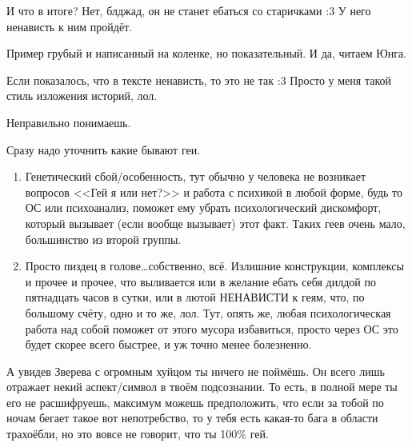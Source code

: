 \documentclass[a4paper,14pt,oneside]{memoir}
\begin{document}
И что в итоге? Нет, блджад, он не станет ебаться со старичками :3 У него ненависть к ним пройдёт. 

Пример грубый и написанный на коленке, но показательный. И да, читаем Юнга. 

Если показалось, что в тексте ненависть, то это не так :3 Просто у меня такой стиль изложения историй, лол.

\medskip


\medskip

Неправильно понимаешь.

Сразу надо уточнить какие бывают геи.

\begin{enumerate}
\item Генетический сбой/особенность, тут обычно у человека не возникает вопросов <<Гей я или нет?>> и работа с психикой в любой форме, будь то ОС или психоанализ, поможет ему убрать психологический дискомфорт, который вызывает (если вообще вызывает) этот факт. Таких геев очень мало, большинство из второй группы.
\item Просто пиздец в голове\ldots собственно, всё. Излишние конструкции, комплексы и прочее и прочее, что выливается или в желание ебать себя дилдой по пятнадцать часов в сутки, или в лютой НЕНАВИСТИ к геям, что, по большому счёту, одно и то же, лол. Тут, опять же, любая психологическая работа над собой поможет от этого мусора избавиться, просто через ОС это будет скорее всего быстрее, и уж точно менее болезненно.
\end{enumerate}


А увидев Зверева с огромным хуйцом ты ничего не поймёшь. Он всего лишь отражает некий аспект/символ в твоём подсознании. То есть, в полной мере ты его не расшифруешь, максимум можешь предположить, что если за тобой по ночам бегает такое вот непотребство, то у тебя есть какая-то бага в области трахоёбли, но это вовсе не говорит, что ты 100\% гей. 
\end{document}
